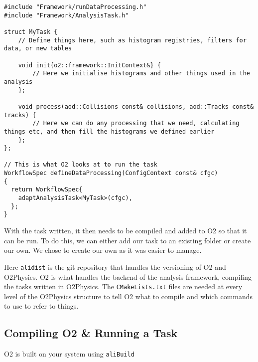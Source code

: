 \begin{lstlisting}
#include "Framework/runDataProcessing.h"
#include "Framework/AnalysisTask.h"

struct MyTask {
    // Define things here, such as histogram registries, filters for data, or new tables

    void init{o2::framework::InitContext&} {
        // Here we initialise histograms and other things used in the analysis
    };

    void process(aod::Collisions const& collisions, aod::Tracks const& tracks) {
        // Here we can do any processing that we need, calculating things etc, and then fill the histograms we defined earlier
    };
};

// This is what O2 looks at to run the task
WorkflowSpec defineDataProcessing(ConfigContext const& cfgc)
{
  return WorkflowSpec{
    adaptAnalysisTask<MyTask>(cfgc),
  };
}

\end{lstlisting}

With the task written, it then needs to be compiled and added to O2 so that it can be run. To do this, we can either add our task to an existing folder or create our own. We chose to create our own as it was easier to manage. 


Here \texttt{alidist} is the git repository that handles the versioning of O2 and O2Physics. O2 is what handles the backend of the analysis framework, compiling the tasks written in O2Physics. The \texttt{CMakeLists.txt} files are needed at every level of the O2Physics structure to tell O2 what to compile and which commands to use to refer to things. 

\subsection{Compiling O2 & Running a Task}\label{sec:CompileRun}
O2 is built on your system using \texttt{aliBuild}~\cite{aliBuild_install}